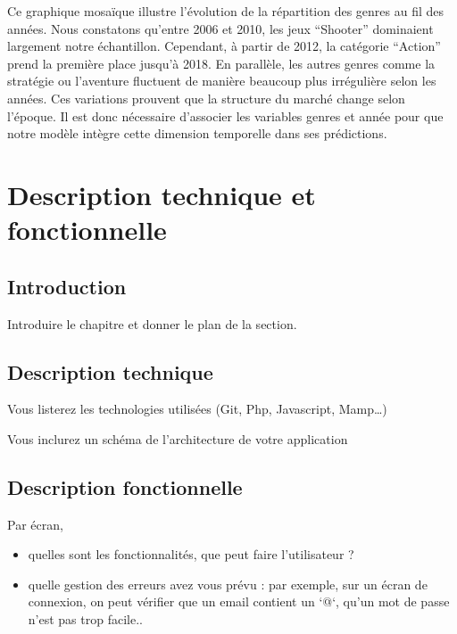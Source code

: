 \documentclass[mstat,12pt]{unswthesis}
\begin{document}
Ce graphique mosaïque illustre l'évolution de la répartition des genres au fil des années. Nous constatons qu'entre 2006 et 2010, les jeux ``Shooter'' dominaient largement notre échantillon. Cependant, à partir de 2012, la catégorie ``Action'' prend la première place jusqu'à 2018. En parallèle, les autres genres comme la stratégie ou l'aventure fluctuent de manière beaucoup plus irrégulière selon les années. Ces variations prouvent que la structure du marché change selon l'époque. Il est donc nécessaire d'associer les variables genres et année pour que notre modèle intègre cette dimension temporelle dans ses prédictions.



\hypertarget{description}{%
\chapter{Description technique et fonctionnelle}\label{description}}

\hypertarget{introDescription}{%
\section{Introduction}\label{introDescription}}


Introduire le chapitre et donner le plan de la section.


\hypertarget{Description technique}{%
\section{Description technique}\label{DescriptionT}}

Vous listerez les  technologies utilisées (Git, Php, Javascript, Mamp…) 

Vous inclurez un schéma de l’architecture de votre application


\hypertarget{Description fonctionnelle}{%
\section{Description fonctionnelle}\label{DescriptionF}}


 Par écran, 
 \begin{itemize}
 \item quelles sont les fonctionnalités, que peut faire l’utilisateur ? 
 \item quelle gestion des erreurs avez vous prévu : par exemple, sur un écran de connexion, on peut vérifier que un email contient un ‘@‘, qu’un mot de passe n’est pas trop facile..
 \end{itemize}
\end{document}

